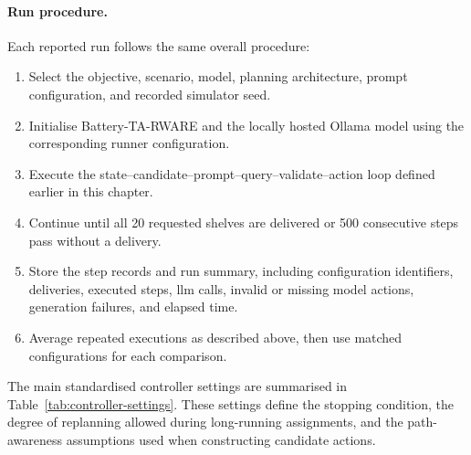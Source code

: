 \paragraph{Run procedure.}
Each reported run follows the same overall procedure:
\begin{enumerate}
    \item Select the objective, scenario, model, planning architecture, prompt configuration, and recorded simulator seed.
    \item Initialise Battery-TA-RWARE and the locally hosted Ollama model using the corresponding runner configuration.
    \item Execute the state--candidate--prompt--query--validate--action loop defined earlier in this chapter.
    \item Continue until all 20 requested shelves are delivered or 500 consecutive steps pass without a delivery.
    \item Store the step records and run summary, including configuration identifiers, deliveries, executed steps, \gls{llm} calls, invalid or missing model actions, generation failures, and elapsed time.
    \item Average repeated executions as described above, then use matched configurations for each comparison.
\end{enumerate}

The main standardised controller settings are summarised in Table~\ref{tab:controller-settings}.
These settings define the stopping condition, the degree of replanning allowed during long-running assignments, and the path-awareness assumptions used when constructing candidate actions.

